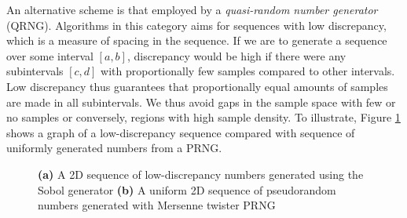 An alternative scheme is that employed by a \emph{quasi-random number
  generator} (QRNG). Algorithms in this category aims for sequences
with low discrepancy, which is a measure of spacing in the
sequence. If we are to generate a sequence over some interval $[a,b]$,
discrepancy would be high if there were any subintervals $[c,d]$ with
proportionally few samples compared to other
intervals. Low discrepancy thus guarantees that proportionally equal
amounts of samples are made in all subintervals. We thus avoid gaps in
the sample space with few or no samples or conversely, regions with
high sample density. To illustrate, Figure \ref{fig:discrepancyplot}
shows a graph of a low-discrepancy sequence compared with sequence of
uniformly generated numbers from a PRNG.

\begin{figure}
	\centering

  \caption{\textbf{(a)} A 2D sequence of low-discrepancy numbers
    generated using the Sobol generator \textbf{(b)} A uniform 2D
    sequence of pseudorandom numbers generated with Mersenne twister
    PRNG}
\label{fig:discrepancyplot}
\end{figure}

